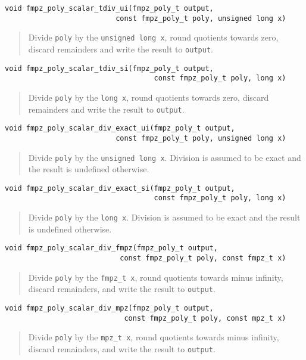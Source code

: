 \documentclass[a4paper,10pt]{article}
\newcommand{\code}{\lstinline}
\begin{document}
\begin{lstlisting}
void fmpz_poly_scalar_tdiv_ui(fmpz_poly_t output, 
                          const fmpz_poly_t poly, unsigned long x)
\end{lstlisting}
\begin{quote}
Divide \code{poly} by the \code{unsigned long x}, round quotients towards zero, discard remainders and write the result to \code{output}.
\end{quote}

\begin{lstlisting}
void fmpz_poly_scalar_tdiv_si(fmpz_poly_t output, 
                                   const fmpz_poly_t poly, long x)
\end{lstlisting}
\begin{quote}
Divide \code{poly} by the \code{long x}, round quotients towards zero, discard remainders and write the result to \code{output}.
\end{quote}

\begin{lstlisting}
void fmpz_poly_scalar_div_exact_ui(fmpz_poly_t output, 
                          const fmpz_poly_t poly, unsigned long x)
\end{lstlisting}
\begin{quote}
Divide \code{poly} by the \code{unsigned long x}. Division is assumed to be exact and the result is undefined otherwise.
\end{quote}

\begin{lstlisting}
void fmpz_poly_scalar_div_exact_si(fmpz_poly_t output, 
                                   const fmpz_poly_t poly, long x)
\end{lstlisting}
\begin{quote}
Divide \code{poly} by the \code{long x}. Division is assumed to be exact and the result is undefined otherwise.
\end{quote}

\begin{lstlisting}
void fmpz_poly_scalar_div_fmpz(fmpz_poly_t output, 
                           const fmpz_poly_t poly, const fmpz_t x) 
\end{lstlisting}
\begin{quote}
Divide \code{poly} by the \code{fmpz_t x}, round quotients towards minus infinity, discard remainders, and write the result to \code{output}. 
\end{quote}

\begin{lstlisting}
void fmpz_poly_scalar_div_mpz(fmpz_poly_t output, 
                            const fmpz_poly_t poly, const mpz_t x) 
\end{lstlisting}
\begin{quote}
Divide \code{poly} by the \code{mpz_t x}, round quotients towards minus infinity, discard remainders, and write the result to \code{output}. 
\end{quote}
\end{document}
